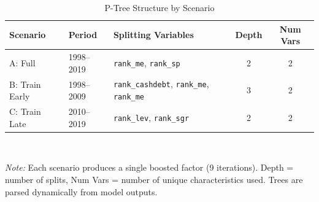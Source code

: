 \begin{table}[!ht]
\centering
\caption{P-Tree Structure by Scenario}
\label{tab:tree_structure}
\begin{tabular}{l|l|l|c|c}
\hline
Scenario & Period & Splitting Variables & Depth & Num Vars \\
\hline
A: Full & 1998--2019 & \texttt{rank\_me}, \texttt{rank\_sp} & 2 & 2 \\
B: Train Early & 1998--2009 & \texttt{rank\_cashdebt}, \texttt{rank\_me}, \texttt{rank\_me} & 3 & 2 \\
C: Train Late & 2010--2019 & \texttt{rank\_lev}, \texttt{rank\_sgr} & 2 & 2 \\
\hline
\end{tabular}
\\[1em]
\begin{minipage}{0.9\textwidth}
\small
\textit{Note:} Each scenario produces a single boosted factor (9 iterations). Depth = number of splits, Num Vars = number of unique characteristics used. Trees are parsed dynamically from model outputs.
\end{minipage}
\end{table}
